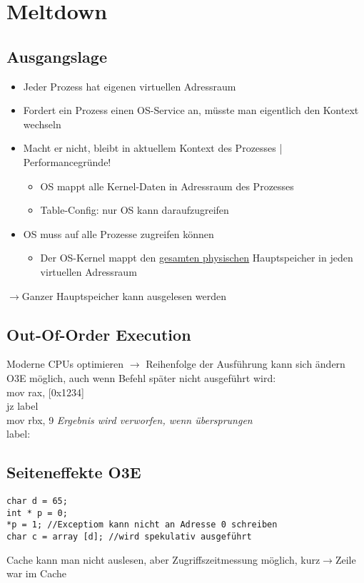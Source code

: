 \section{Meltdown}

\subsection{Ausgangslage}
\begin{itemize}
    \item Jeder Prozess hat eigenen virtuellen Adressraum
    \item Fordert ein Prozess einen OS-Service an, müsste man eigentlich den Kontext wechseln
    \item Macht er nicht, bleibt in aktuellem Kontext des Prozesses | Performancegründe!
    \begin{itemize}
        \item OS mappt alle Kernel-Daten in Adressraum des Prozesses
        \item Table-Config: nur OS kann daraufzugreifen
    \end{itemize}
    \item OS muss auf alle Prozesse zugreifen können
    \begin{itemize}
        \item Der OS-Kernel mappt den \underline{gesamten physischen} Hauptspeicher in jeden virtuellen Adressraum
    \end{itemize}
\end{itemize}
$\rightarrow$Ganzer Hauptspeicher kann ausgelesen werden

\subsection{Out-Of-Order Execution}
Moderne CPUs optimieren $\rightarrow$ Reihenfolge der Ausführung kann sich ändern
O3E möglich, auch wenn Befehl später nicht ausgeführt wird:\\
mov rax, [0x1234]\\
jz label\\
mov rbx, 9 \textit{Ergebnis wird verworfen, wenn übersprungen}\\
label:

\subsection{Seiteneffekte O3E}
\begin{verbatim}
char d = 65;
int * p = 0;
*p = 1; //Exceptiom kann nicht an Adresse 0 schreiben
char c = array [d]; //wird spekulativ ausgeführt
\end{verbatim}
Cache kann man nicht auslesen, aber Zugriffszeitmessung möglich, kurz$\rightarrow$Zeile war im Cache

